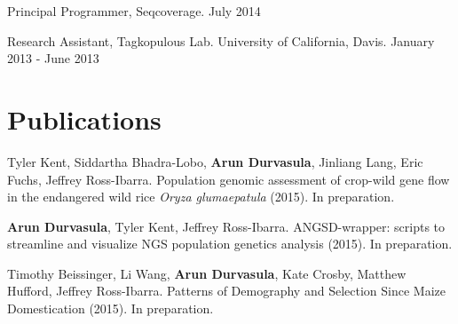 \documentclass[letterpaper]{article}
\renewenvironment{itemize}{
  \begin{list}{}{
    \setlength{\leftmargin}{1.5em}
  }
}{
  \end{list}
}
\begin{document}
\begin{itemize}
\item Principal Programmer, Seqcoverage. \hfill July 2014
\item Research Assistant, Tagkopulous Lab. University of California, Davis. \hfill January 2013 - June 2013
\end{itemize}

\section*{Publications}
\begin{itemize}
\item Tyler Kent, Siddartha Bhadra-Lobo, {\bf Arun Durvasula}, Jinliang Lang, Eric Fuchs, Jeffrey Ross-Ibarra. Population genomic assessment of crop-wild gene flow in the endangered wild rice \emph{Oryza glumaepatula} (2015). In preparation.
\item {\bf Arun Durvasula}, Tyler Kent, Jeffrey Ross-Ibarra. ANGSD-wrapper: scripts to streamline and visualize NGS population genetics analysis (2015). In preparation. %
\item Timothy Beissinger, Li Wang,  {\bf Arun Durvasula}, Kate Crosby, Matthew Hufford, Jeffrey Ross-Ibarra. Patterns of Demography and Selection Since Maize Domestication (2015). In preparation.
\end{itemize}
\end{document}
